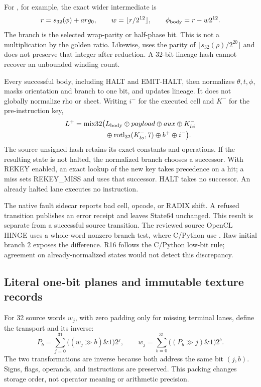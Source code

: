 For , for example, the exact wider intermediate is
\begin{equation}
 r=s_{32}(\phi)+arg_0,\qquad
 w=\lfloor r/2^{12}\rfloor,\qquad \phi_{\rm body}=r-w2^{12}.
 \label{eq:r16-phase}
\end{equation}
The branch is the selected wrap-parity or half-phase bit. This is not
a multiplication by the golden ratio. Likewise,  uses the
parity of $\lfloor s_{32}(\rho)/2^{20}\rfloor$ and does not preserve
that integer after reduction. A 32-bit lineage hash cannot recover
an unbounded winding count.

Every successful body, including HALT and EMIT-HALT, then normalizes
$\theta,t,\phi$, masks orientation and branch to one bit, and updates
lineage. It does not globally normalize rho or sheet. Writing $i^-$
for the executed cell and $K^-$ for the pre-instruction key,
\begin{equation}
 \begin{split}
 L^+=\operatorname{mix32}\bigl(&L_{\rm body}\oplus payload\oplus aux
       \oplus K_{hi}^-\\
       &\oplus\operatorname{rotl}_{32}(K_{lo}^-,7)
       \oplus b^+\oplus i^-\bigr).
 \end{split}
 \label{eq:r16-lineage}
\end{equation}
The source unsigned hash retains its exact constants and operations.
If the resulting state is not halted, the normalized branch chooses
a successor. With REKEY enabled, an exact lookup of the new key takes
precedence on a hit; a miss sets REKEY\_MISS and uses that successor.
HALT takes no successor. An already halted lane executes no instruction.

The native fault sidecar reports bad cell, opcode, or RADIX shift. A
refused transition publishes an error receipt and leaves State64
unchanged. This result is separate from a successful source transition.
The reviewed source OpenCL HINGE uses a whole-word nonzero branch test,
where C/Python use . Raw initial branch $2$ exposes
the difference. R16 follows the C/Python low-bit rule; agreement on
already-normalized states would not detect this discrepancy.

\subsection{Literal one-bit planes and immutable texture records}

For 32 source words $w_j$, with zero padding only for missing terminal
lanes, define the transport and its inverse:
\begin{equation}
 P_b=\sum_{j=0}^{31}\bigl((w_j\gg b)\mathbin\&1\bigr)2^j,
 \qquad
 w_j=\sum_{b=0}^{31}\bigl((P_b\gg j)\mathbin\&1\bigr)2^b.
 \label{eq:r16-planes}
\end{equation}
The two transformations are inverse because both address the same bit
$(j,b)$. Signs, flags, operands, and instructions are preserved. This
packing changes storage order, not operator meaning or arithmetic precision.


